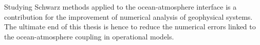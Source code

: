 \par
Studying Schwarz methods applied to the ocean-atmosphere interface
is a contribution for the improvement of numerical analysis of
geophysical systems. The ultimate end of this thesis is
hence to reduce the numerical errors linked to the ocean-atmosphere
coupling in operational models.
